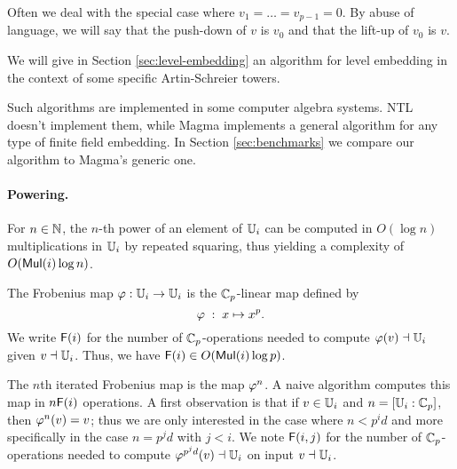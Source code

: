 Often we deal with the special case where $v_1 = \ldots = v_{p-1} =
0$. By abuse of language, we will say that the push-down of $v$ is
$v_0$ and that the lift-up of $v_0$ is $v$.

We will give in Section \ref{sec:level-embedding} an algorithm for
level embedding in the context of some specific Artin-Schreier
towers. 

Such algorithms are implemented in some computer algebra systems. NTL
doesn't implement them, while Magma implements a general algorithm for
any type of finite field embedding. 
In Section \ref{sec:benchmarks} we compare our algorithm to
Magma's generic one.

\paragraph{Powering.}
For $n\in \mathbb{N}$, the $n$-th power of an element of $\mathbb{U}_i$ can be
computed in $O(\log n)$ multiplications in $\mathbb{U}_i$ by repeated
squaring, thus yielding a complexity of $O(\mathrm{\sf Mul}(i)\log n)$.

The Frobenius map $\varphi : \mathbb{U}_i \rightarrow \mathbb{U}_i$ is the $\mathbb{C}_p$-linear
map defined by
\[\varphi \;:\; x \mapsto x^p \text{.}\]
We write $\mathrm{\sf F}(i)$ for the number of $\mathbb{C}_p$-operations needed to
compute $\varphi(v) \dashv \mathbb{U}_i$ given $v \dashv \mathbb{U}_i$. Thus, we have
$\mathrm{\sf F}(i) \in O(\mathrm{\sf Mul}(i)\log p)$.


The $n$th iterated Frobenius map is the map $\varphi^n$. A naive
algorithm computes this map in $n\mathrm{\sf F}(i)$ operations. A first
observation is that if $v\in\mathbb{U}_i$ and ${n=[\mathbb{U}_i:\mathbb{C}_p]}$, then
$\varphi^n(v) = v$; thus we are only interested in the case where $n <
p^id$ and more specifically in the case $n=p^jd$ with $j<i$. We note
$\mathrm{\sf F}(i,j)$ for the number of $\mathbb{C}_p$-operations needed to compute
$\varphi^{p^jd}(v)\dashv \mathbb{U}_i$ on input $v\dashv\mathbb{U}_i$.

